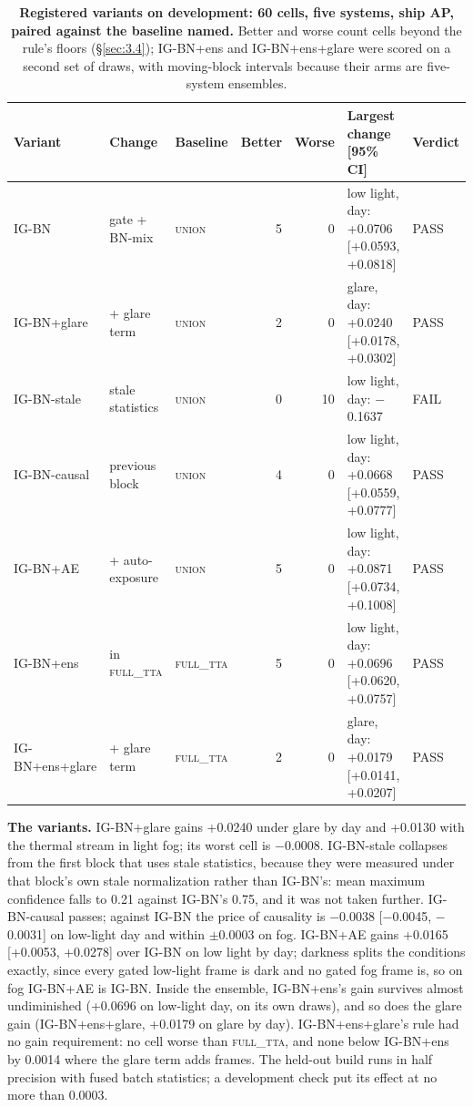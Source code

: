 \documentclass[10pt]{article}
\begin{document}
\begin{table}[htbp]
\centering
\footnotesize
\caption{\textbf{Registered variants on development: 60 cells, five systems, ship AP, paired against the baseline named.} Better and worse count cells beyond the rule's floors (\S\ref{sec:3.4}); IG-BN+ens and IG-BN+ens+glare were scored on a second set of draws, with moving-block intervals because their arms are five-system ensembles.}
\label{tab:2}
\setlength{\tabcolsep}{3pt}
\begin{tabularx}{\linewidth}{lllrr>{\raggedright\arraybackslash}Xl}
\toprule
Variant & Change & Baseline & Better & Worse & Largest change [95\% CI] & Verdict \\
\midrule
IG-BN & gate + BN-mix & \textsc{union} & 5 & 0 & low light, day: +0.0706 [+0.0593, +0.0818] & PASS \\
IG-BN+glare & + glare term & \textsc{union} & 2 & 0 & glare, day: +0.0240 [+0.0178, +0.0302] & PASS \\
IG-BN-stale & stale statistics & \textsc{union} & 0 & 10 & low light, day: $-$0.1637 & FAIL \\
IG-BN-causal & previous block & \textsc{union} & 4 & 0 & low light, day: +0.0668 [+0.0559, +0.0777] & PASS \\
IG-BN+AE & + auto-exposure & \textsc{union} & 5 & 0 & low light, day: +0.0871 [+0.0734, +0.1008] & PASS \\
IG-BN+ens & in \textsc{full\_tta} & \textsc{full\_tta} & 5 & 0 & low light, day: +0.0696 [+0.0620, +0.0757] & PASS \\
IG-BN+ens+glare & + glare term & \textsc{full\_tta} & 2 & 0 & glare, day: +0.0179 [+0.0141, +0.0207] & PASS \\
\bottomrule
\end{tabularx}
\end{table}
\textbf{The variants.} IG-BN+glare gains +0.0240 under glare by day and +0.0130 with the thermal stream in light fog; its worst cell is $-$0.0008. IG-BN-stale collapses from the first block that uses stale statistics, because they were measured under that block's own stale normalization rather than IG-BN's: mean maximum confidence falls to 0.21 against IG-BN's 0.75, and it was not taken further. IG-BN-causal passes; against IG-BN the price of causality is $-$0.0038 [$-$0.0045, $-$0.0031] on low-light day and within $\pm$0.0003 on fog. IG-BN+AE gains +0.0165 [+0.0053, +0.0278] over IG-BN on low light by day; darkness splits the conditions exactly, since every gated low-light frame is dark and no gated fog frame is, so on fog IG-BN+AE is IG-BN. Inside the ensemble, IG-BN+ens's gain survives almost undiminished (+0.0696 on low-light day, on its own draws), and so does the glare gain (IG-BN+ens+glare, +0.0179 on glare by day). IG-BN+ens+glare's rule had no gain requirement: no cell worse than \textsc{full\_tta}, and none below IG-BN+ens by 0.0014 where the glare term adds frames. The held-out build runs in half precision with fused batch statistics; a development check put its effect at no more than 0.0003.
\end{document}
